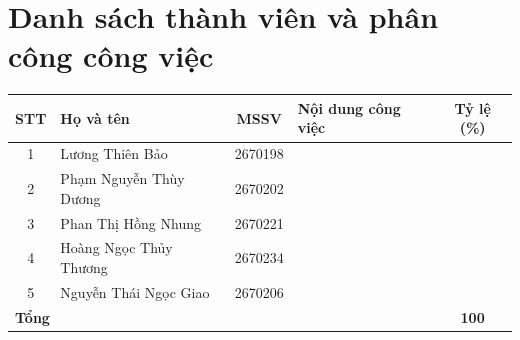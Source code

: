 \section*{Danh sách thành viên và phân công công việc}

\begin{table}[H]
\centering\small
\renewcommand{\arraystretch}{1.9}
\begin{tabular}{clc>{\raggedright\arraybackslash}p{5.4cm}c}
\toprule
\textbf{STT} & \textbf{Họ và tên} & \textbf{MSSV} & \textbf{Nội dung công việc} & \textbf{Tỷ lệ (\%)} \\
\midrule
1 & Lương Thiên Bảo & 2670198 & & \\
2 & Phạm Nguyễn Thùy Dương & 2670202 & & \\
3 & Phan Thị Hồng Nhung & 2670221 & & \\
4 & Hoàng Ngọc Thủy Thương & 2670234 & & \\
5 & Nguyễn Thái Ngọc Giao & 2670206 & & \\
\midrule
\multicolumn{4}{l}{\textbf{Tổng}} & \textbf{100} \\
\bottomrule
\end{tabular}
\end{table}
